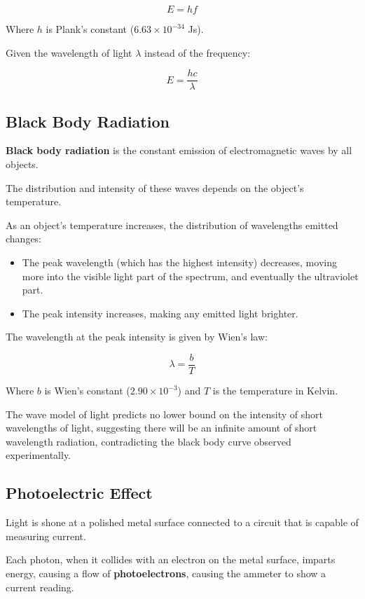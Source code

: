 \documentclass[a4paper,11pt]{report}
\begin{document}
$$
E = hf
$$

Where $h$ is Plank's constant ($6.63 \times 10^{-34}$ Js).

Given the wavelength of light $\lambda$ instead of the frequency:

$$
E = \frac{hc}{\lambda}
$$

\subsection{Black Body Radiation}


\textbf{Black body radiation} is the constant emission of electromagnetic waves
by all objects.

The distribution and intensity of these waves depends on the object's
temperature.

As an object's temperature increases, the distribution of wavelengths emitted
changes:

\begin{itemize}
\item The peak wavelength (which has the highest intensity) decreases, moving
	more into the visible light part of the spectrum, and eventually the
	ultraviolet part.
\item The peak intensity increases, making any emitted light brighter.
\end{itemize}

The wavelength at the peak intensity is given by Wien's law:

$$
\lambda = \frac{b}{T}
$$

Where $b$ is Wien's constant ($2.90 \times 10^{-3}$) and $T$ is the temperature
in Kelvin.

The wave model of light predicts no lower bound on the intensity of short
wavelengths of light, suggesting there will be an infinite amount of short
wavelength radiation, contradicting the black body curve observed
experimentally.

\subsection{Photoelectric Effect}

Light is shone at a polished metal surface connected to a circuit that is
capable of measuring current.

Each photon, when it collides with an electron on the metal surface, imparts
energy, causing a flow of \textbf{photoelectrons}, causing the ammeter to show
a current reading.
\end{document}
